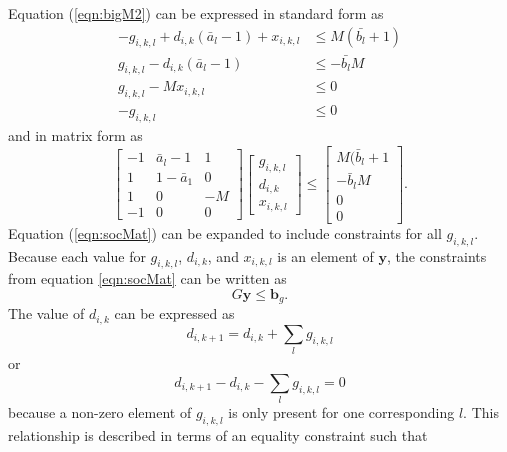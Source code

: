 \par Equation (\ref{eqn:bigM2}) can be expressed in standard form as 
\begin{equation}\label{eqn:chargeConstraints}
	\begin{aligned} 
		-g_{i,k,l} + d_{i,k}(\bar{a}_l - 1) + x_{i,k,l} &\le M(\bar{b_l} + 1) \\
		 g_{i,k,l} - d_{i,k}(\bar{a}_l - 1)  &\le  - \bar{b_l}M \\
		 g_{i,k,l} - Mx_{i,k,l} &\le 0 \\
		-g_{i,k,l} &\le 0  
	\end{aligned}
\end{equation} 
and in matrix form as
\begin{equation}\label{eqn:socMat}
	\begin{bmatrix}
		-1 & \bar{a}_l - 1 & 1 \\
		1 & 1 - \bar{a}_1 & 0\\
		1 & 0 & -M \\
		-1 & 0 & 0
	\end{bmatrix}
	\begin{bmatrix}
		g_{i,k,l} \\
		d_{i,k}\\
		x_{i,k,l}
	\end{bmatrix}
	\le 
	\begin{bmatrix}
		M(\bar{b}_l + 1 \\
		-\bar{b}_lM\\
		0\\
		0
	\end{bmatrix}.
\end{equation}
Equation (\ref{eqn:socMat}) can be expanded to include constraints for all $g_{i,k,l}$.  Because each value for $g_{i,k,l}$, $d_{i,k}$, and $x_{i,k,l}$ is an element of $\mathbf{y}$, the constraints from equation \ref{eqn:socMat} can be written as 
\begin{equation}\label{eqn:dSocMat}
	G\mathbf{y} \le \mathbf{b}_g.
\end{equation}
The value of $d_{i,k}$ can be expressed as 
\begin{equation}\label{eqn:totalG}
	d_{i,k + 1} = d_{i,k} + \sum_l g_{i,k,l} 
\end{equation}
or 
\begin{equation}
	d_{i,k + 1} - d_{i,k} - \sum_l g_{i,k,l} = 0
\end{equation}
because a non-zero element of $g_{i,k,l}$ is only present for one corresponding $l$. This relationship is described in terms of an equality constraint such that
